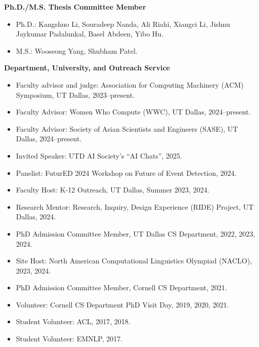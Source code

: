 \noindent \textbf{Ph.D./M.S. Thesis Committee Member}
\begin{itemize}[label={},leftmargin=15pt]
\item Ph.D.: Kangshuo Li, Souradeep Nanda, Ali Riahi, Xiangci Li, Jishnu Jaykumar Padalunkal, Basel Abdeen, Yibo Hu.
\item M.S.: Wooseong Yang, Shubham Patel.
\end{itemize}

\noindent \textbf{Department, University, and Outreach Service}
\begin{itemize}[label={},leftmargin=15pt]
\item Faculty advisor and judge: Association for Computing Machinery (ACM) Symposium, UT Dallas, 2023--present.
\item Faculty Advisor: Women Who Compute (WWC), UT Dallas, 2024--present.
\item Faculty Advisor: Society of Asian Scientists and Engineers (SASE), UT Dallas, 2024--present.
\item Invited Speaker: UTD AI Society's ``AI Chats'', 2025.
\item Panelist: FuturED 2024 Workshop on Future of Event Detection, 2024.
\item Faculty Host: K-12 Outreach, UT Dallas, Summer 2023, 2024.
\item Research Mentor: Research, Inquiry, Design Experience (RIDE) Project, UT Dallas, 2024.
\item PhD Admission Committee Member, UT Dallas CS Department, 2022, 2023, 2024.
\item Site Host: North American Computational Linguistics Olympiad (NACLO), 2023, 2024.
\item PhD Admission Committee Member, Cornell CS Department, 2021.
\item Volunteer: Cornell CS Department PhD Visit Day, 2019, 2020, 2021.
\item Student Volunteer: ACL, 2017, 2018.
\item Student Volunteer: EMNLP, 2017.
\end{itemize}
